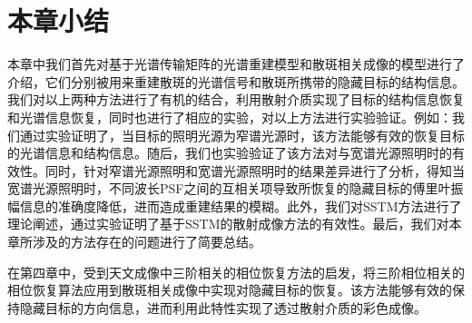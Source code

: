 \section{本章小结}

本章中我们首先对基于光谱传输矩阵的光谱重建模型和散斑相关成像的模型进行了介绍，它们分别被用来重建散斑的光谱信号和散斑所携带的隐藏目标的结构信息。我们对以上两种方法进行了有机的结合，利用散射介质实现了目标的结构信息恢复和光谱信息恢复，同时也进行了相应的实验，对以上方法进行实验验证。例如：我们通过实验证明了，当目标的照明光源为窄谱光源时，该方法能够有效的恢复目标的光谱信息和结构信息。随后，我们也实验验证了该方法对与宽谱光源照明时的有效性。同时，针对窄谱光源照明和宽谱光源照明时的结果差异进行了分析，得知当宽谱光源照明时，不同波长PSF之间的互相关项导致所恢复的隐藏目标的傅里叶振幅信息的准确度降低，进而造成重建结果的模糊。此外，我们对SSTM方法进行了理论阐述，通过实验证明了基于SSTM的散射成像方法的有效性。最后，我们对本章所涉及的方法存在的问题进行了简要总结。

在第四章中，受到天文成像中三阶相关的相位恢复方法的启发，将三阶相位相关的相位恢复算法应用到散斑相关成像中实现对隐藏目标的恢复。该方法能够有效的保持隐藏目标的方向信息，进而利用此特性实现了透过散射介质的彩色成像。
